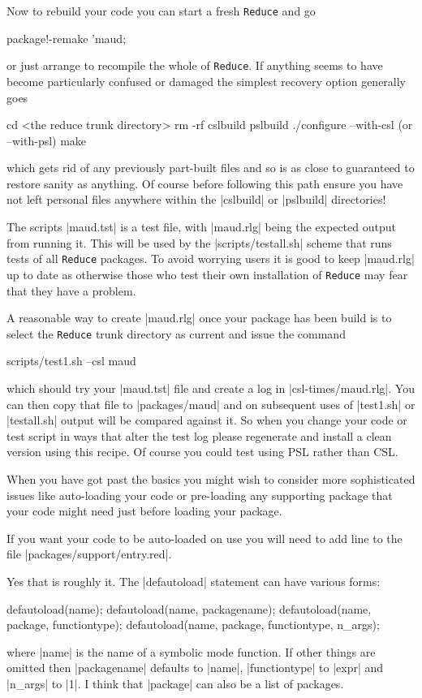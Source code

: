 \documentclass[12pt,twoside,openright]{memoir}
\newcommand{\reduce}{\texttt{Reduce}\xspace}
\begin{document}
Now to rebuild your code you can start a fresh \reduce and go
\begin{rlispverb}
  package!-remake 'maud;
\end{rlispverb}
or just arrange to recompile the whole of \reduce. If anything seems to
have become particularly confused or damaged the simplest recovery
option generally goes
\begin{rlispverb}
  cd <the reduce trunk directory>
  rm -rf cslbuild pslbuild
  ./configure --with-csl (or --with-psl)
  make
\end{rlispverb}
which gets rid of any previously part-built files and so is as close
to guaranteed to restore sanity as anything. Of course before following
this path ensure you have not left personal files anywhere within the
|cslbuild| or |pslbuild| directories!

The scripts |maud.tst| is a test file, with |maud.rlg| being the
expected output from running it. This will be used by the |scripts/testall.sh|
scheme that runs tests of all \reduce packages. To avoid worrying users it is
good to keep |maud.rlg| up to date as otherwise those who test their own
installation of \reduce may fear that they have a problem.

A reasonable way to create |maud.rlg| once your package has been build is
to select the \reduce trunk directory as current and issue the command
\begin{rlispverb}
  scripts/test1.sh --csl maud
\end{rlispverb}
which should try your |maud.tst| file and create a log in
|csl-times/maud.rlg|. You can then copy that file to |packages/maud| and
on subsequent uses of |test1.sh| or |testall.sh| output will be compared
against it. So when you change your code or test script in ways that
alter the test log please regenerate and install a clean version using
this recipe. Of course you could test using PSL rather than CSL.

When you have got past the basics you might wish to consider more sophisticated
issues like auto-loading your code or pre-loading any supporting package that
your code might need just before loading your package.

If you want your code to be auto-loaded on use you will need to add
line to the file |packages/support/entry.red|.

Yes that is roughly it. The |defautoload| statement can have various forms:
\begin{rlispverb}
  defautoload(name); %
  defautoload(name, packagename);
  defautoload(name, package, functiontype);
  defautoload(name, package, functiontype, n_args);
\end{rlispverb}
where |name| is the name of a symbolic mode function. If other things are
omitted then |packagename| defaults to |name|, |functiontype| to |expr| and
|n_args| to |1|. I think that |package| can also be a list of packages.
\end{document}

